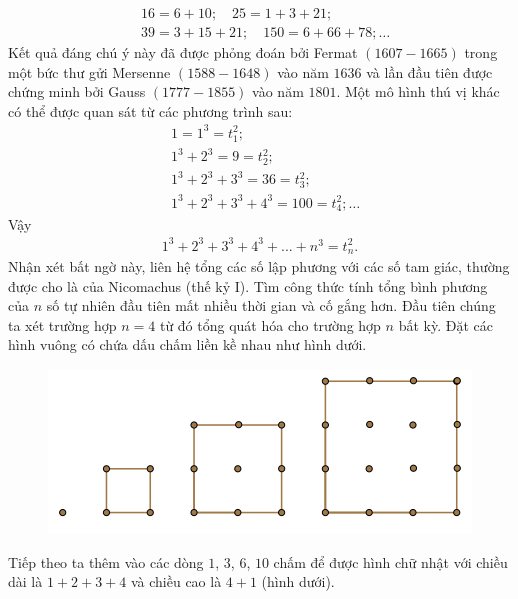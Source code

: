 \begin{multicols}{2}
\begin{align*}
			&16 = 6 + 10;\quad 25 = 1 + 3 + 21;\\
			&39 = 3 + 15 + 21;\quad 150 = 6 + 66 + 78; \ldots
	\end{align*}
	Kết quả đáng chú ý này đã được phỏng đoán bởi Fermat $(1607-1665)$ trong một bức thư gửi Mersenne  $(1588-1648)$ vào năm $1636$ và lần đầu tiên được chứng minh bởi Gauss $(1777-1855)$  vào năm $1801$.
	\vskip 0.1cm
	Một mô hình thú vị khác có thể được quan sát từ các phương trình sau:
	\begin{align*}
			&1 = {1^3} = t_1^2;\\[-0.5ex]
			&{1^3} + {2^3} = 9 = t_2^2;\\[-0.5ex]
			&{1^3} + {2^3} + {3^3} = 36 = t_3^2; \\[-0.5ex]
			&{1^3} + {2^3} + {3^3} + {4^3} = 100 = t_4^2;\ldots
	\end{align*}
	Vậy
	\begin{align*}
		{1^3} + {2^3} + {3^3} + {4^3} + ... + {n^3} = t_n^2.
	\end{align*}
	Nhận xét bất ngờ này, liên hệ tổng các số lập phương với các số tam giác, thường được cho là của Nicomachus (thế kỷ I).
	\vskip 0.1cm
	Tìm công thức tính tổng bình phương của $n$  số tự nhiên đầu tiên mất nhiều thời gian và cố gắng hơn. 
	\vskip 0.1cm
	Đầu tiên chúng ta xét trường hợp $n=4$ từ đó tổng quát hóa cho trường hợp $n$  bất kỳ. 
	\vskip 0.1cm
	Đặt các hình vuông có chứa  dấu chấm liền kề nhau như hình dưới.
	\begin{figure}[H]
		\vspace*{-5pt}
		\centering
		\captionsetup{labelformat= empty, justification=centering}
		\includegraphics[width= 1\linewidth]{10}
		\vspace*{-15pt}
	\end{figure}
	Tiếp theo ta thêm vào các dòng $1$, $3$, $6$, $10$ chấm để được hình chữ nhật với chiều dài là $1+2+3+4$ và chiều cao là $4+1$ (hình dưới).  
	\begin{figure}[H]

\end{figure}
\end{multicols}
